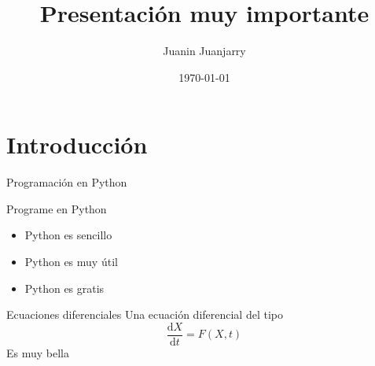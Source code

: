 \documentclass[style=inkeda,mode=print,paper=smartboard,orient=landscape]{powerdot}
\title{Presentación muy importante}
\author{Juanin Juanjarry}
\date{\today}
\begin{document}
\maketitle

\section{Introducción}
\begin{slide}{Programaci\'on en Python}

Programe en Python \pause\\
\begin{itemize}\pause
    \item Python es sencillo\pause
    \item Python es muy \'util \pause
    \item Python es gratis
\end{itemize}
\end{slide}

\begin{slide}{Ecuaciones diferenciales}
\centering
Una ecuación diferencial del tipo
$$
\frac{\mathrm{d}X}{\mathrm{d}t}=F(X,t)
$$
 Es muy bella
 \end{slide}
\end{document}
